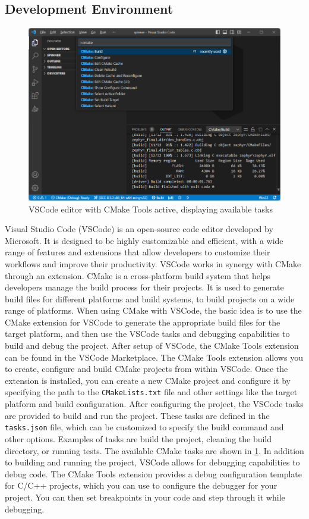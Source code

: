 \subsection{Development Environment}
\begin{figure}[htbp]
	\centering
	\includegraphics[width=.8\textwidth]{Figures/3_cmake_vscode.png}
	\caption[VSCode editor with CMake Tools active]{VSCode editor with CMake Tools active, displaying available tasks}
	\label{fig:3_vscode_cmake_build}
\end{figure}

Visual Studio Code (VSCode) is an \gls{open-source} code editor developed by Microsoft. It is designed to be highly customizable and efficient, with a wide range of features and extensions that allow developers to customize their workflows and improve their productivity. VSCode works in synergy with CMake through an extension. CMake is a cross-platform build system that helps developers manage the build process for their projects. It is used to generate build files for different platforms and build systems, to build projects on a wide range of platforms. When using CMake with VSCode, the basic idea is to use the CMake extension for VSCode to generate the appropriate build files for the target platform, and then use the VSCode tasks and debugging capabilities to build and debug the project. After setup of VSCode, the CMake Tools \cite{cmake} extension can be found in the VSCode Marketplace. The CMake Tools extension allows you to create, configure and build CMake projects from within VSCode. Once the extension is installed, you can create a new CMake project and configure it by specifying the path to the \texttt{CMakeLists.txt} file and other settings like the target platform and build configuration. After configuring the project, the VSCode tasks are provided to build and run the project. These tasks are defined in the \texttt{tasks.json} file, which can be customized to specify the build command and other options. Examples of tasks are build the project, cleaning the build directory, or running tests. The available CMake tasks are shown in \cref{fig:3_vscode_cmake_build}. In addition to building and running the project, VSCode allows for debugging capabilities to debug code. The CMake Tools extension provides a debug configuration template for C/C++ projects, which you can use to configure the debugger for your project. You can then set breakpoints in your code and step through it while debugging.

